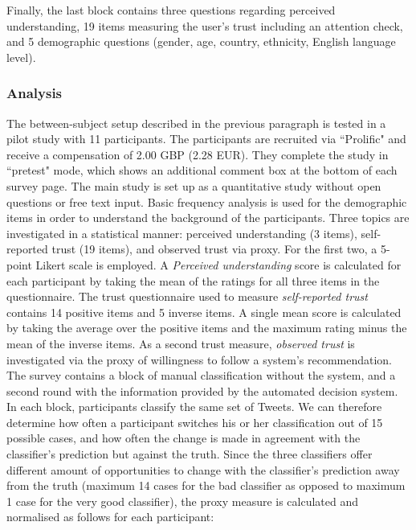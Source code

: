 Finally, the last block contains three questions regarding perceived understanding, 19 items measuring the user's trust including an attention check, and 5 demographic questions (gender, age, country, ethnicity, English language level).\newline

\subsubsection{Analysis}
The between-subject setup described in the previous paragraph is tested in a pilot study with 11 participants. The participants are recruited via ``Prolific" and receive a compensation of 2.00 GBP (2.28 EUR). They complete the study in ``pretest" mode, which shows an additional comment box at the bottom of each survey page.\newline
The main study is set up as a quantitative study without open questions or free text input. Basic frequency analysis is used for the demographic items in order to understand the background of the participants. Three topics are investigated in a statistical manner: perceived understanding (3 items), self-reported trust (19 items), and observed trust via proxy. For the first two, a 5-point Likert scale is employed.\newline
A \textit{Perceived understanding} score is calculated for each participant by taking the mean of the ratings for all three items in the questionnaire. The trust questionnaire used to measure \textit{self-reported trust} contains 14 positive items and 5 inverse items. A single mean score is calculated by taking the average over the positive items and the maximum rating minus the mean of the inverse items. As a second trust measure, \textit{observed trust} is investigated via the proxy of willingness to follow a system's recommendation. The survey contains a block of manual classification without the system, and a second round with the information provided by the automated decision system. In each block, participants classify the same set of Tweets. We can therefore determine how often a participant switches his or her classification out of 15 possible cases, and how often the change is made in agreement with the classifier's prediction but against the truth. Since the three classifiers offer different amount of opportunities to change with the classifier's prediction away from the truth (maximum 14 cases for the bad classifier as opposed to maximum 1 case for the very good classifier), the proxy measure is calculated and normalised as follows for each participant:
